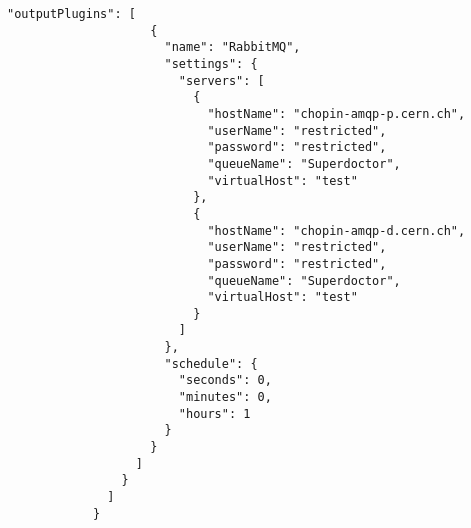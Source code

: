 \begin{lstlisting}[style=csharp, caption=Fichero de configuración]
                  "outputPlugins": [
                    {
                      "name": "RabbitMQ",
                      "settings": {
                        "servers": [
                          {
                            "hostName": "chopin-amqp-p.cern.ch",
                            "userName": "restricted",
                            "password": "restricted",
                            "queueName": "Superdoctor",
                            "virtualHost": "test"
                          },
                          {
                            "hostName": "chopin-amqp-d.cern.ch",
                            "userName": "restricted",
                            "password": "restricted",
                            "queueName": "Superdoctor",
                            "virtualHost": "test"
                          }
                        ]
                      },
                      "schedule": {
                        "seconds": 0,
                        "minutes": 0,
                        "hours": 1
                      }
                    }
                  ]
                }
              ]
            }
        \end{lstlisting}